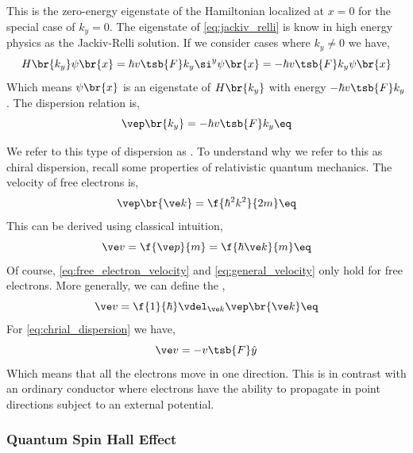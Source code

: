 \documentclass{article}
\begin{document}
This is the zero-energy eigenstate of the Hamiltonian localized at $x = 0$ for the special case of $k_y = 0$.
The eigenstate of \cref{eq:jackiv_relli} is know in high energy physics as the Jackiv-Relli solution.
If we consider cases where $k_y \neq 0$ we have,
\[ H\br{k_y} \psi\br{x} = \hbar v\tsb{F} k_y \si^{y} \psi\br{x} = - \hbar v\tsb{F} k_y \psi\br{x} \]
Which means $\psi\br{x}$ is an eigenstate of $H\br{k_y}$ with energy $- \hbar v\tsb{F} k_y$. The dispersion relation is,
\[ \vep\br{k_y} = - \hbar v\tsb{F} k_y \eq \label{eq:chrial_dispersion}\]
\begin{center}
\end{center}
We refer to this type of dispersion as . To understand why we refer to this as chiral dispersion, recall some properties of relativistic quantum mechanics. The velocity of free electrons is,
\[ \vep\br{\ve k} = \f{\hbar^2 k^2}{2 m} \eq \label{eq:free_electron_velocity}\]
This can be derived using classical intuition,
\[ \ve v = \f{\ve p}{m} = \f{\hbar \ve k}{m} \eq \label{eq:general_velocity}\]
Of course, \cref{eq:free_electron_velocity} and \cref{eq:general_velocity} only hold for free electrons. More generally, we can define the ,
\[ \ve v = \f{1}{\hbar} \vdel_{\ve k} \vep\br{\ve k} \eq \label{eq:group_velocity}\]
For \cref{eq:chrial_dispersion} we have,
\[ \ve v = - v\tsb{F} \hat y \]
Which means that all the electrons move in one direction. This is in contrast with an ordinary conductor where electrons have the ability to propagate in point directions subject to an external potential.

\subsubsection{Quantum Spin Hall Effect}
\end{document}
